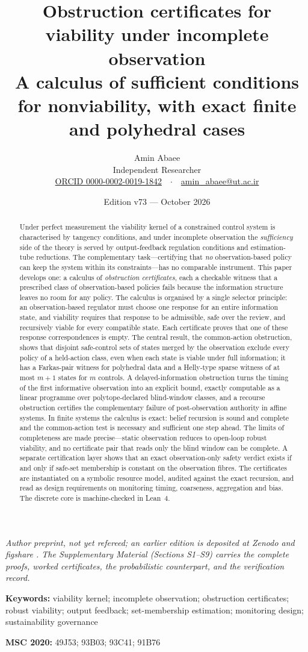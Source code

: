 \documentclass[11pt,a4paper]{article}
\title{\vspace{-1.2em}Obstruction certificates for viability under incomplete observation\\[0.3em]
{\large A calculus of sufficient conditions for nonviability, with exact finite and polyhedral cases}}
\author{Amin Abaee\\[0.3em]
{\normalsize Independent Researcher}\\
{\normalsize \href{https://orcid.org/0000-0002-0019-1842}{ORCID 0000-0002-0019-1842}\ \ $\cdot$\ \ \href{mailto:amin_abaee@ut.ac.ir}{amin\_abaee@ut.ac.ir}}}
\date{Edition v73 --- October 2026}
\theoremstyle{plain}
\theoremstyle{definition}
\theoremstyle{remark}
\begin{document}
\maketitle
\vspace{-1.5em}
\begin{center}\small\emph{Author preprint, not yet refereed; an earlier edition is deposited at Zenodo and figshare \citep{abaee2026preprint}. The Supplementary Material (Sections S1--S9) carries the complete proofs, worked certificates, the probabilistic counterpart, and the verification record.}\end{center}

\begin{abstract}
\noindent
Under perfect measurement the viability kernel of a constrained control system is characterised by tangency conditions, and under incomplete observation the \emph{sufficiency} side of the theory is served by output-feedback regulation conditions and estimation-tube reductions. The complementary task---certifying that \emph{no} observation-based policy can keep the system within its constraints---has no comparable instrument. This paper develops one: a calculus of \emph{obstruction certificates}, each a checkable witness that a prescribed class of observation-based policies fails because the information structure leaves no room for any policy. The calculus is organised by a single selector principle: an observation-based regulator must choose one response for an entire information state, and viability requires that response to be admissible, safe over the review, and recursively viable for every compatible state. Each certificate proves that one of these response correspondences is empty. The central result, the common-action obstruction, shows that disjoint safe-control sets of states merged by the observation exclude every policy of a held-action class, even when each state is viable under full information; it has a Farkas-pair witness for polyhedral data and a Helly-type sparse witness of at most $m+1$ states for $m$ controls. A delayed-information obstruction turns the timing of the first informative observation into an explicit bound, exactly computable as a linear programme over polytope-declared blind-window classes, and a recourse obstruction certifies the complementary failure of post-observation authority in affine systems. In finite systems the calculus is exact: belief recursion is sound and complete and the common-action test is necessary and sufficient one step ahead. The limits of completeness are made precise---static observation reduces to open-loop robust viability, and no certificate pair that reads only the blind window can be complete. A separate certification layer shows that an exact observation-only safety verdict exists if and only if safe-set membership is constant on the observation fibres. The certificates are instantiated on a symbolic resource model, audited against the exact recursion, and read as design requirements on monitoring timing, coarseness, aggregation and bias. The discrete core is machine-checked in Lean~4.
\end{abstract}

\noindent\textbf{Keywords:} viability kernel; incomplete observation; obstruction certificates; robust viability; output feedback; set-membership estimation; monitoring design; sustainability governance

\smallskip\noindent\textbf{MSC 2020:} 49J53; 93B03; 93C41; 91B76
\end{document}
